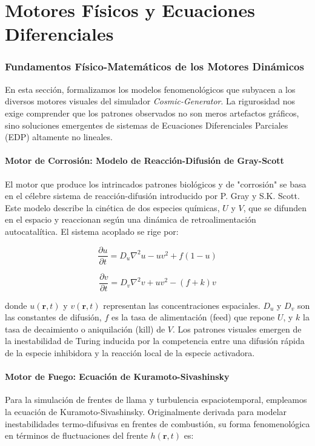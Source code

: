 \documentclass[12pt, openany]{book}
\begin{document}
\part{Motores Físicos y Ecuaciones Diferenciales}

\section{Fundamentos Físico-Matemáticos de los Motores Dinámicos}
\label{sec:fundamentos_motores}

En esta sección, formalizamos los modelos fenomenológicos que subyacen a los diversos motores visuales del simulador \textit{Cosmic-Generator}. La rigurosidad nos exige comprender que los patrones observados no son meros artefactos gráficos, sino soluciones emergentes de sistemas de Ecuaciones Diferenciales Parciales (EDP) altamente no lineales.

\subsection{Motor de Corrosión: Modelo de Reacción-Difusión de Gray-Scott}
El motor que produce los intrincados patrones biológicos y de "corrosión" se basa en el célebre sistema de reacción-difusión introducido por P. Gray y S.K. Scott. Este modelo describe la cinética de dos especies químicas, $U$ y $V$, que se difunden en el espacio y reaccionan según una dinámica de retroalimentación autocatalítica. El sistema acoplado se rige por:

\begin{equation}
\frac{\partial u}{\partial t} = D_u \nabla^2 u - u v^2 + f(1 - u)
\end{equation}

\begin{equation}
\frac{\partial v}{\partial t} = D_v \nabla^2 v + u v^2 - (f + k)v
\end{equation}

donde $u(\mathbf{r},t)$ y $v(\mathbf{r},t)$ representan las concentraciones espaciales. $D_u$ y $D_v$ son las constantes de difusión, $f$ es la tasa de alimentación (feed) que repone $U$, y $k$ la tasa de decaimiento o aniquilación (kill) de $V$. Los patrones visuales emergen de la inestabilidad de Turing inducida por la competencia entre una difusión rápida de la especie inhibidora y la reacción local de la especie activadora.

\subsection{Motor de Fuego: Ecuación de Kuramoto-Sivashinsky}
Para la simulación de frentes de llama y turbulencia espaciotemporal, empleamos la ecuación de Kuramoto-Sivashinsky. Originalmente derivada para modelar inestabilidades termo-difusivas en frentes de combustión, su forma fenomenológica en términos de fluctuaciones del frente $h(\mathbf{r},t)$ es:
\end{document}
